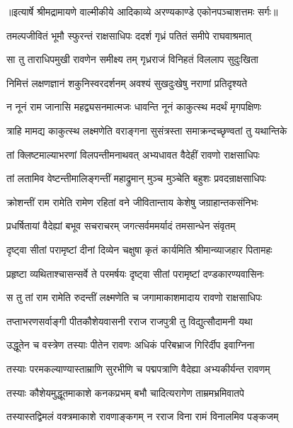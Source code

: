 {॥इत्यार्षे श्रीमद्रामायणे वाल्मीकीये आदिकाव्ये अरण्यकाण्डे एकोनपञ्चाशत्तमः सर्गः॥}


\twolineshloka
{तमल्पजीवितं भूमौ स्फुरन्तं राक्षसाधिपः}
{ददर्श गृध्रं पतितं समीपे राघवाश्रमात्} %

\twolineshloka
{सा तु ताराधिपमुखी रावणेन समीक्ष्य तम्}
{गृध्रराजं विनिहतं विललाप सुदुःखिता} %

\twolineshloka
{निमित्तं लक्षणज्ञानं शकुनिस्वरदर्शनम्}
{अवश्यं सुखदुःखेषु नराणां प्रतिदृश्यते} %

\twolineshloka
{न नूनं राम जानासि महद्व्यसनमात्मजः}
{धावन्ति नूनं काकुत्स्थ मदर्थं मृगपक्षिणः} %

\twolineshloka
{त्राहि मामद्य काकुत्स्थ लक्ष्मणेति वराङ्गना}
{सुसंत्रस्ता समाक्रन्दच्छृण्वतां तु यथान्तिके} %

\twolineshloka
{तां क्लिष्टमाल्याभरणां विलपन्तीमनाथवत्}
{अभ्यधावत वैदेहीं रावणो राक्षसाधिपः} %

\twolineshloka
{तां लतामिव वेष्टन्तीमालिङ्गन्तीं महाद्रुमान्}
{मुञ्च मुञ्चेति बहुशः प्रवदन्राक्षसाधिपः} %

\twolineshloka
{क्रोशन्तीं राम रामेति रामेण रहितां वने}
{जीवितान्ताय केशेषु जग्राहान्तकसंनिभः} %

\twolineshloka
{प्रधर्षितायां वैदेह्यां बभूव सचराचरम्}
{जगत्सर्वममर्यादं तमसान्धेन संवृतम्} %

\twolineshloka
{दृष्ट्वा सीतां परामृष्टां दीनां दिव्येन चक्षुषा}
{कृतं कार्यमिति श्रीमान्व्याजहार पितामहः} %

\twolineshloka
{प्रहृष्टा व्यथिताश्चासन्सर्वे ते परमर्षयः}
{दृष्ट्वा सीतां परामृष्टां दण्डकारण्यवासिनः} %

\twolineshloka
{स तु तां राम रामेति रुदन्तीं लक्ष्मणेति च}
{जगामाकाशमादाय रावणो राक्षसाधिपः} %

\twolineshloka
{तप्ताभरणसर्वाङ्गी पीतकौशेयवासनी}
{रराज राजपुत्री तु विद्युत्सौदामनी यथा} %

\twolineshloka
{उद्धूतेन च वस्त्रेण तस्याः पीतेन रावणः}
{अधिकं परिबभ्राज गिरिर्दीप इवाग्निना} %

\twolineshloka
{तस्याः परमकल्याण्यास्ताम्राणि सुरभीणि च}
{पद्मपत्राणि वैदेह्या अभ्यकीर्यन्त रावणम्} %

\twolineshloka
{तस्याः कौशेयमुद्धूतमाकाशे कनकप्रभम्}
{बभौ चादित्यरागेण ताम्रमभ्रमिवातपे} %

\twolineshloka
{तस्यास्तद्विमलं वक्त्रमाकाशे रावणाङ्कगम्}
{न रराज विना रामं विनालमिव पङ्कजम्} %

